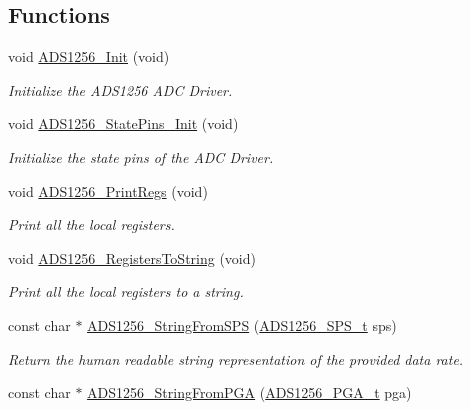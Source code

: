 \subsection*{Functions}
\begin{DoxyCompactItemize}
\item 
void \hyperlink{group__ads1256__driver_ga817dc23392ce56ae255cb3238d796b60}{A\-D\-S1256\-\_\-\-Init} (void)
\begin{DoxyCompactList}\small\item\em Initialize the A\-D\-S1256 A\-D\-C Driver. \end{DoxyCompactList}\item 
void \hyperlink{group__ads1256__driver_gac1a6ea86db094b51ec478098738353b4}{A\-D\-S1256\-\_\-\-State\-Pins\-\_\-\-Init} (void)
\begin{DoxyCompactList}\small\item\em Initialize the state pins of the A\-D\-C Driver. \end{DoxyCompactList}\item 
void \hyperlink{group__ads1256__driver_ga9642423b95878836291bbf57102e92a6}{A\-D\-S1256\-\_\-\-Print\-Regs} (void)
\begin{DoxyCompactList}\small\item\em Print all the local registers. \end{DoxyCompactList}\item 
void \hyperlink{group__ads1256__driver_gacbbff85197a622b07cfb2bf47b57c29b}{A\-D\-S1256\-\_\-\-Registers\-To\-String} (void)
\begin{DoxyCompactList}\small\item\em Print all the local registers to a string. \end{DoxyCompactList}\item 
const char $\ast$ \hyperlink{group__ads1256__driver_gabfd8ef639770cdb94388e1b63da1b0ba}{A\-D\-S1256\-\_\-\-String\-From\-S\-P\-S} (\hyperlink{group__ads1256__driver_gab0437f81aad031aadf3e05dd5fe0a731}{A\-D\-S1256\-\_\-\-S\-P\-S\-\_\-t} sps)
\begin{DoxyCompactList}\small\item\em Return the human readable string representation of the provided data rate. \end{DoxyCompactList}\item 
const char $\ast$ \hyperlink{group__ads1256__driver_ga59c2fb71d5fac95ab30f4c66c0e4a9e2}{A\-D\-S1256\-\_\-\-String\-From\-P\-G\-A} (\hyperlink{group__ads1256__driver_gace2e231df7cd3598eb26d5ff51171701}{A\-D\-S1256\-\_\-\-P\-G\-A\-\_\-t} pga)

\end{DoxyCompactItemize}
